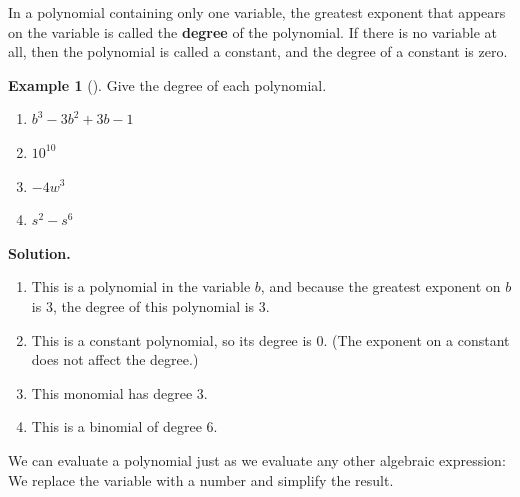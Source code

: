 \documentclass[10pt,]{book}
\newcommand{\terminology}[1]{\textbf{#1}}
\theoremstyle{plain}
\theoremstyle{definition}
\theoremstyle{definition}
\newtheorem{example}[theorem]{Example}
\theoremstyle{definition}
\numberwithin{equation}{part}
\begin{document}
\par
In a polynomial containing only one variable, the greatest exponent that appears on the variable is called the \terminology{degree} of the polynomial. If there is no variable at all, then the polynomial is called a constant, and the degree of a constant is zero.%
\begin{example}[]\label{example-42}
Give the degree of each polynomial. \leavevmode%
\begin{enumerate}[label=*\alph**]
\item\hypertarget{li-212}{}\(b^3 − 3b^2 + 3b − 1\)%
\item\hypertarget{li-213}{}\(10^{10}\)%
\item\hypertarget{li-214}{}\(−4w^3\)%
\item\hypertarget{li-215}{}\(s^2 − s^6\)%
\end{enumerate}
%
\par\medskip\noindent%
\textbf{Solution.}\quad \leavevmode%
\begin{enumerate}[label=*\alph**]
\item\hypertarget{li-216}{}This is a polynomial in the variable \(b\), and because the greatest exponent on \(b\) is \(3\), the degree of this polynomial is \(3\).%
\item\hypertarget{li-217}{}This is a constant polynomial, so its degree is \(0\). (The exponent on a constant does not affect the degree.)%
\item\hypertarget{li-218}{}This monomial has degree \(3\).%
\item\hypertarget{li-219}{}This is a binomial of degree \(6\).%
\end{enumerate}
%
\end{example}
\par
We can evaluate a polynomial just as we evaluate any other algebraic expression: We replace the variable with a number and simplify the result.%
\end{document}
